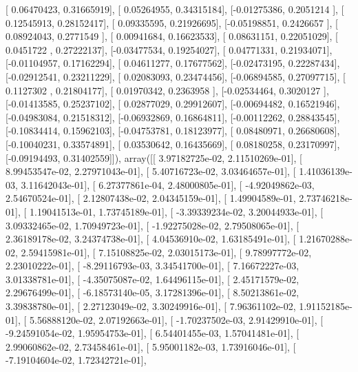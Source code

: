 \documentclass{article}
\begin{document}
       [ 0.06470423,  0.31665919],
       [ 0.05264955,  0.34315184],
       [-0.01275386,  0.2051214 ],
       [ 0.12545913,  0.28152417],
       [ 0.09335595,  0.21926695],
       [-0.05198851,  0.2426657 ],
       [ 0.08924043,  0.2771549 ],
       [ 0.00941684,  0.16623533],
       [ 0.08631151,  0.22051029],
       [ 0.0451722 ,  0.27222137],
       [-0.03477534,  0.19254027],
       [ 0.04771331,  0.21934071],
       [-0.01104957,  0.17162294],
       [ 0.04611277,  0.17677562],
       [-0.02473195,  0.22287434],
       [-0.02912541,  0.23211229],
       [ 0.02083093,  0.23474456],
       [-0.06894585,  0.27097715],
       [ 0.1127302 ,  0.21804177],
       [ 0.01970342,  0.2363958 ],
       [-0.02534464,  0.3020127 ],
       [-0.01413585,  0.25237102],
       [ 0.02877029,  0.29912607],
       [-0.00694482,  0.16521946],
       [-0.04983084,  0.21518312],
       [-0.06932869,  0.16864811],
       [-0.00112262,  0.28843545],
       [-0.10834414,  0.15962103],
       [-0.04753781,  0.18123977],
       [ 0.08480971,  0.26680608],
       [-0.10040231,  0.33574891],
       [ 0.03530642,  0.16435669],
       [ 0.08180258,  0.23170997],
       [-0.09194493,  0.31402559]]), array([[  3.97182725e-02,   2.11510269e-01],
       [  8.99453547e-02,   2.27971043e-01],
       [  5.40716723e-02,   3.03464657e-01],
       [  1.41036139e-03,   3.11642043e-01],
       [  6.27377861e-04,   2.48000805e-01],
       [ -4.92049862e-03,   2.54670524e-01],
       [  2.12807438e-02,   2.04345159e-01],
       [  1.49904589e-01,   2.73746218e-01],
       [  1.19041513e-01,   1.73745189e-01],
       [ -3.39339234e-02,   3.20044933e-01],
       [  3.09332465e-02,   1.70949723e-01],
       [ -1.92275028e-02,   2.79508065e-01],
       [  2.36189178e-02,   3.24374738e-01],
       [  4.04536910e-02,   1.63185491e-01],
       [  1.21670288e-02,   2.59415981e-01],
       [  7.15108825e-02,   2.03015173e-01],
       [  9.78997772e-02,   2.23010222e-01],
       [ -8.29116793e-03,   3.34541700e-01],
       [  7.16672227e-03,   3.01338781e-01],
       [ -4.35075087e-02,   1.64496115e-01],
       [  2.45171579e-02,   2.29676499e-01],
       [ -6.18573140e-05,   3.17281396e-01],
       [  8.50213861e-02,   3.39838780e-01],
       [  2.27123049e-02,   3.30249916e-01],
       [  7.96361102e-02,   1.91152185e-01],
       [  5.56888120e-02,   2.07192663e-01],
       [ -1.70237502e-03,   2.91429910e-01],
       [ -9.24591054e-02,   1.95954753e-01],
       [  6.54401455e-03,   1.57041481e-01],
       [  2.99060862e-02,   2.73458461e-01],
       [  5.95001182e-03,   1.73916046e-01],
       [ -7.19104604e-02,   1.72342721e-01],
\end{document}
